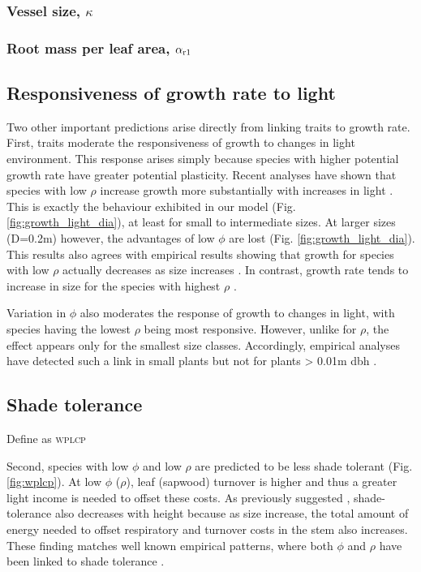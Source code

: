 \documentclass[a4paper,11pt]{article}
\begin{document}
\subsubsection{Vessel size, $\kappa$}

\subsubsection{Root mass per leaf area, $\alpha_{\rm r1}$}


\subsection{Responsiveness of growth rate to light}

Two other important predictions arise directly from linking traits to growth rate. First, traits moderate the responsiveness of growth to changes in light environment. This response arises simply because species with higher potential growth rate have greater potential plasticity. Recent analyses have shown that species with low $\rho$ increase growth more substantially with increases in light \citep{Ruger-2012}. This is exactly the behaviour exhibited in our model (Fig. \ref{fig:growth_light_dia}), at least for small to intermediate sizes. At larger sizes (D=0.2m) however, the advantages of low $\phi$ are lost (Fig. \ref{fig:growth_light_dia}). This results also agrees with empirical results showing that growth for species with low $\rho$ actually decreases as size increases \citep{Ruger-2012}. In contrast, growth rate tends to increase in size for the species with highest $\rho$ \citep{Ruger-2012}.

Variation in $\phi$ also moderates the response of growth to changes in light, with species having the lowest $\rho$ being most responsive. However, unlike for $\rho$, the effect appears only for the smallest size classes. Accordingly, empirical analyses have detected such a link in small plants but not for plants \textgreater{} 0.01m dbh \citep{Ruger-2012}.


\subsection{Shade tolerance}

Define as \textsc{wplcp}

Second, species with low $\phi$ and low $\rho$ are predicted to be less shade tolerant (Fig. \ref{fig:wplcp}). At low $\phi$ ($\rho$), leaf (sapwood) turnover is higher and thus a greater light income is needed to offset these costs. As previously suggested \citep{Givnish-1988}, shade-tolerance also decreases with height because as size increase, the total amount of energy needed to offset respiratory and turnover costs in the stem also increases. These finding matches well known empirical patterns, where both $\phi$ and $\rho$ have been linked to shade tolerance \citep{Poorter-2006, Lusk-2008,Osunkoya-1996}.
\end{document}
